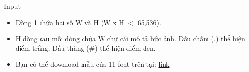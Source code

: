 Input  
\begin{itemize}
	\item 

     Dòng  1 chứa hai số W và H (W x H $<$ 65,536).    
	\item 

     H dòng sau mỗi dòng chứa W chữ cái mô tả bức ảnh. Dấu  chấm (.) thể hiện điểm trắng. Dấu thăng (\#) thể hiện điểm đen.    
	\item 

     Bạn có thể download mẫu của 11 font trên tại:     \href{../../../content/voj:VMVSOS.zip}{      link     }
\end{itemize}